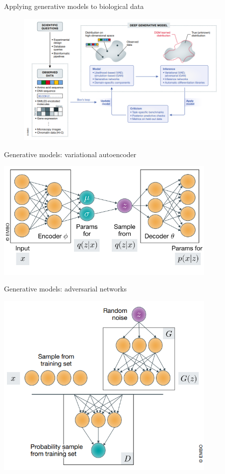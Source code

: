 \documentclass{beamer}					%
\begin{document}
\begin{frame}{Applying generative models to biological data}
\begin{figure}
\includegraphics[height=65mm, width=105mm]{dbm}
\end{figure}
\end{frame}

\begin{frame}{Generative models: variational autoencoder}

\begin{center}
\includegraphics[width=0.8\textwidth]{vae}
\end{center}

\end{frame}

\begin{frame}{Generative models: adversarial networks}

\begin{center}
\includegraphics[width=0.8\textwidth]{gan}
\end{center}


\end{frame}
\end{document}
